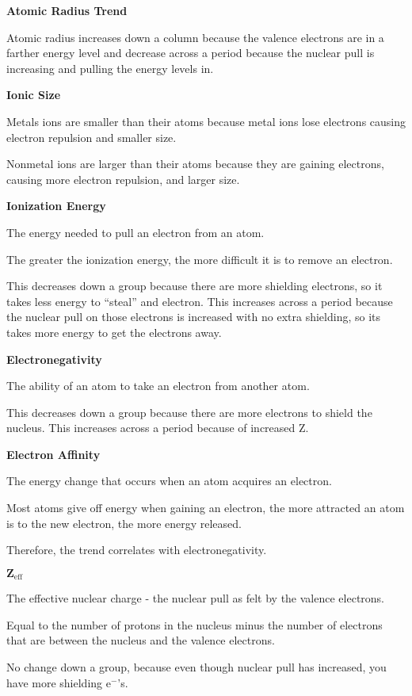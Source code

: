 \documentclass[../hchem.tex]{subfiles}
\begin{document}
\textbf{Atomic Radius Trend}

Atomic radius increases down a column because the valence electrons are in a farther energy level and 
decrease across a period because the nuclear pull is increasing and pulling the energy levels in.

\textbf{Ionic Size}

Metals ions are smaller than their atoms because metal ions lose electrons causing electron repulsion and smaller size.

Nonmetal ions are larger than their atoms because they are gaining electrons, causing more electron repulsion, and larger size.

\textbf{Ionization Energy}

The energy needed to pull an electron from an atom.

The greater the ionization energy, the more difficult it is to remove an electron.

This decreases down a group because there are more shielding electrons, so it takes less energy to ``steal'' and electron. This increases across a period because the nuclear 
pull on those electrons is increased with no extra shielding, so its takes more energy to get the electrons away.

\textbf{Electronegativity}

The ability of an atom to take an electron from another atom.

This decreases down a group because there are more electrons to shield the nucleus. This increases across a period because of increased Z.

\textbf{Electron Affinity}

The energy change that occurs when an atom acquires an electron.

Most atoms give off energy when gaining an electron, the more attracted an atom is to the new electron, the more energy released.

Therefore, the trend correlates with electronegativity.

$\textbf{Z}_{\text{eff}}$

The effective nuclear charge - the nuclear pull as felt by the valence electrons.

Equal to the number of protons in the nucleus minus the number of electrons that are between the nucleus and the valence electrons.

No change down a group, because even though nuclear pull has increased, you have more shielding e$^-$'s.
\end{document}
